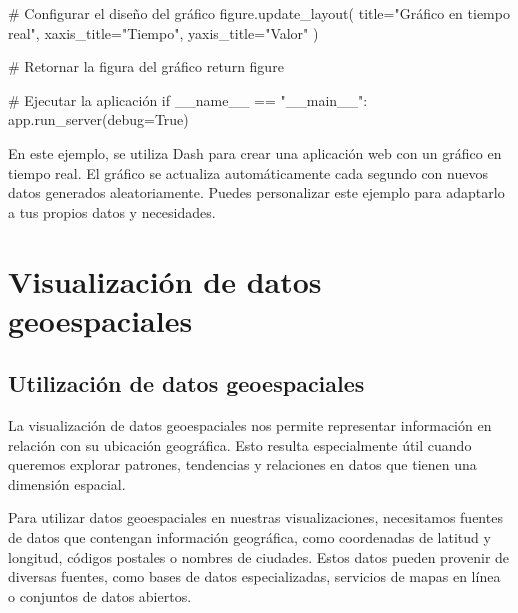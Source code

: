 \documentclass[
  a4paper,
]{article}
\newenvironment{Shaded}{}{}
\newcommand{\CommentTok}[1]{\textcolor[rgb]{0.42,0.45,0.49}{#1}}
\newcommand{\ControlFlowTok}[1]{\textcolor[rgb]{0.84,0.23,0.29}{#1}}
\newcommand{\NormalTok}[1]{\textcolor[rgb]{0.14,0.16,0.18}{#1}}
\newcommand{\OperatorTok}[1]{\textcolor[rgb]{0.14,0.16,0.18}{#1}}
\newcommand{\StringTok}[1]{\textcolor[rgb]{0.01,0.18,0.38}{#1}}
\newcommand{\VariableTok}[1]{\textcolor[rgb]{0.89,0.38,0.04}{#1}}
\begin{document}
\begin{Shaded}
\begin{Highlighting}[]
    \CommentTok{\# Configurar el diseño del gráfico}
\NormalTok{    figure.update\_layout(}
\NormalTok{        title}\OperatorTok{=}\StringTok{"Gráfico en tiempo real"}\NormalTok{,}
\NormalTok{        xaxis\_title}\OperatorTok{=}\StringTok{"Tiempo"}\NormalTok{,}
\NormalTok{        yaxis\_title}\OperatorTok{=}\StringTok{"Valor"}
\NormalTok{    )}

    \CommentTok{\# Retornar la figura del gráfico}
    \ControlFlowTok{return}\NormalTok{ figure}

\CommentTok{\# Ejecutar la aplicación}
\ControlFlowTok{if} \VariableTok{\_\_name\_\_} \OperatorTok{==} \StringTok{"\_\_main\_\_"}\NormalTok{:}
\NormalTok{    app.run\_server(debug}\OperatorTok{=}\VariableTok{True}\NormalTok{)}
\end{Highlighting}
\end{Shaded}

En este ejemplo, se utiliza Dash para crear una aplicación web con un
gráfico en tiempo real. El gráfico se actualiza automáticamente cada
segundo con nuevos datos generados aleatoriamente. Puedes personalizar
este ejemplo para adaptarlo a tus propios datos y necesidades.

\hypertarget{visualizaciuxf3n-de-datos-geoespaciales}{%
\section{Visualización de datos
geoespaciales}\label{visualizaciuxf3n-de-datos-geoespaciales}}

\hypertarget{utilizaciuxf3n-de-datos-geoespaciales}{%
\subsection{Utilización de datos
geoespaciales}\label{utilizaciuxf3n-de-datos-geoespaciales}}

La visualización de datos geoespaciales nos permite representar
información en relación con su ubicación geográfica. Esto resulta
especialmente útil cuando queremos explorar patrones, tendencias y
relaciones en datos que tienen una dimensión espacial.

Para utilizar datos geoespaciales en nuestras visualizaciones,
necesitamos fuentes de datos que contengan información geográfica, como
coordenadas de latitud y longitud, códigos postales o nombres de
ciudades. Estos datos pueden provenir de diversas fuentes, como bases de
datos especializadas, servicios de mapas en línea o conjuntos de datos
abiertos.
\end{document}
